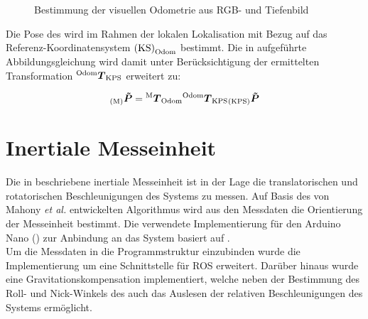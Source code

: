 \begin{figure}[!ht]
	\begin{center}
	\hspace{5mm}
	\caption{Bestimmung der visuellen Odometrie aus RGB- und Tiefenbild}
	\label{fig.fovis}
	\end{center}
\end{figure}

Die Pose des  wird im Rahmen der lokalen Lokalisation mit Bezug auf das Referenz-Koordinatensystem ${\mathrm{(KS)}}_{\mathrm{Odom}}$ bestimmt. Die in  aufgeführte Abbildungsgleichung wird damit unter Berücksichtigung der ermittelten Transformation ${^{\mathrm{Odom}}\mbox{\boldmath{$T$}}_{\mathrm{KPS}}}$ erweitert zu:

\begin{equation}
{_{{\mathrm{(M)}}}}\mbox{\boldmath{$\tilde{P}$}} = {^{\mathrm{M}}\mbox{\boldmath{$T$}}_{\mathrm{Odom}}}{^{\mathrm{Odom}}\mbox{\boldmath{$T$}}_{\mathrm{KPS}}}{_{{\mathrm{(KPS)}}}}\mbox{\boldmath{$\tilde{P}$}}
\label{eq.locloc}
\end{equation}


\section{Inertiale Messeinheit}
Die in  beschriebene inertiale Messeinheit ist in der Lage die translatorischen und rotatorischen Beschleunigungen des Systems zu messen. Auf Basis des von Mahony \textit{et al.} \cite{Mahony2008} entwickelten Algorithmus wird aus den Messdaten die Orientierung der Messeinheit bestimmt. Die verwendete Implementierung für den Arduino Nano () zur Anbindung an das System basiert auf \cite{IMUCode}.\\
Um die Messdaten in die Programmstruktur einzubinden wurde die Implementierung um eine Schnittstelle für ROS erweitert. Darüber hinaus wurde eine Gravitationskompensation implementiert, welche neben der Bestimmung des Roll- und Nick-Winkels des  auch das Auslesen der relativen Beschleunigungen des Systems ermöglicht.\\

